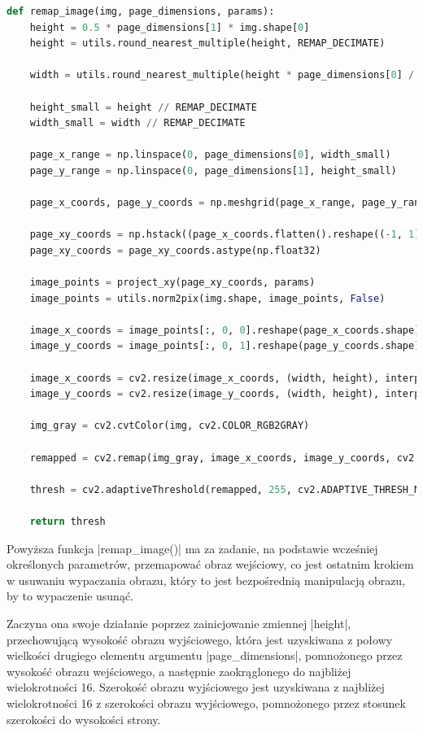 \begin{lstlisting}[caption={\pyth|remap_image()| - funkcja remapowania wypaczonego obrazu}, label={remap-image}, language=Python]
def remap_image(img, page_dimensions, params):
	height = 0.5 * page_dimensions[1] * img.shape[0]
	height = utils.round_nearest_multiple(height, REMAP_DECIMATE)
	
	width = utils.round_nearest_multiple(height * page_dimensions[0] / page_dimensions[1], REMAP_DECIMATE)
	
	height_small = height // REMAP_DECIMATE
	width_small = width // REMAP_DECIMATE
	
	page_x_range = np.linspace(0, page_dimensions[0], width_small)
	page_y_range = np.linspace(0, page_dimensions[1], height_small)
	
	page_x_coords, page_y_coords = np.meshgrid(page_x_range, page_y_range)
	
	page_xy_coords = np.hstack((page_x_coords.flatten().reshape((-1, 1)), page_y_coords.flatten().reshape((-1, 1))))
	page_xy_coords = page_xy_coords.astype(np.float32)
	
	image_points = project_xy(page_xy_coords, params)
	image_points = utils.norm2pix(img.shape, image_points, False)
	
	image_x_coords = image_points[:, 0, 0].reshape(page_x_coords.shape)
	image_y_coords = image_points[:, 0, 1].reshape(page_y_coords.shape)
	
	image_x_coords = cv2.resize(image_x_coords, (width, height), interpolation=cv2.INTER_CUBIC)
	image_y_coords = cv2.resize(image_y_coords, (width, height), interpolation=cv2.INTER_CUBIC)
	
	img_gray = cv2.cvtColor(img, cv2.COLOR_RGB2GRAY)
	
	remapped = cv2.remap(img_gray, image_x_coords, image_y_coords, cv2.INTER_CUBIC, None, cv2.BORDER_REPLICATE)
	
	thresh = cv2.adaptiveThreshold(remapped, 255, cv2.ADAPTIVE_THRESH_MEAN_C, cv2.THRESH_BINARY, ADA_THRESH_WIN_SZ, 25)
	
	return thresh
\end{lstlisting}

Powyższa funkcja \pyth|remap_image()| ma za zadanie, na podstawie wcześniej określonych parametrów, przemapować obraz wejściowy, co jest ostatnim krokiem w usuwaniu wypaczania obrazu, który to jest bezpośrednią manipulacją obrazu, by to wypaczenie usunąć.

Zaczyna ona swoje działanie poprzez zainicjowanie zmiennej \pyth|height|, przechowującą wysokość obrazu wyjściowego, która jest uzyskiwana z połowy wielkości drugiego elementu argumentu \pyth|page_dimensions|, pomnożonego przez wysokość obrazu wejściowego, a następnie zaokrąglonego do najbliżej wielokrotności 16. Szerokość obrazu wyjściowego jest uzyskiwana z najbliżej wielokrotności 16 z szerokości obrazu wyjściowego, pomnożonego przez stosunek szerokości do wysokości strony.

